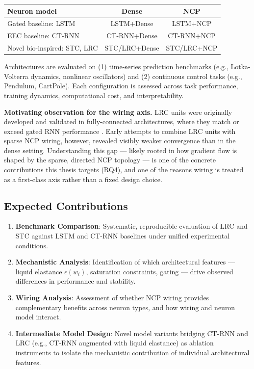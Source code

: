 \documentclass[11pt,a4paper]{article}
\begin{document}
\begin{center}
\setlength{\tabcolsep}{6pt}
\begin{tabular}{l|cc}
\textbf{Neuron model} & \textbf{Dense} & \textbf{NCP} \\
\hline
Gated baseline: LSTM         & LSTM+Dense        & LSTM+NCP \\
EEC baseline: CT-RNN         & CT-RNN+Dense      & CT-RNN+NCP \\
Novel bio-inspired: STC, LRC & STC/LRC+Dense     & STC/LRC+NCP \\
\end{tabular}
\end{center}

\noindent Architectures are evaluated on (1) time-series prediction benchmarks (e.g., Lotka-Volterra dynamics, nonlinear oscillators) and (2) continuous control tasks (e.g., Pendulum, CartPole). Each configuration is assessed across task performance, training dynamics, computational cost, and interpretability.

\smallskip
\noindent \textbf{Motivating observation for the wiring axis.} LRC units were originally developed and validated in fully-connected architectures, where they match or exceed gated RNN performance \cite{Farsang2024liquid}. Early attempts to combine LRC units with sparse NCP wiring, however, revealed visibly weaker convergence than in the dense setting. Understanding this gap --- likely rooted in how gradient flow is shaped by the sparse, directed NCP topology --- is one of the concrete contributions this thesis targets (RQ4), and one of the reasons wiring is treated as a first-class axis rather than a fixed design choice.

\subsection*{Expected Contributions}

\begin{enumerate}
    \item \textbf{Benchmark Comparison}: Systematic, reproducible evaluation of LRC and STC against LSTM and CT-RNN baselines under unified experimental conditions.
    \item \textbf{Mechanistic Analysis}: Identification of which architectural features --- liquid elastance $\epsilon(w_i)$, saturation constraints, gating --- drive observed differences in performance and stability.
    \item \textbf{Wiring Analysis}: Assessment of whether NCP wiring provides complementary benefits across neuron types, and how wiring and neuron model interact.
    \item \textbf{Intermediate Model Design}: Novel model variants bridging CT-RNN and LRC (e.g., CT-RNN augmented with liquid elastance) as ablation instruments to isolate the mechanistic contribution of individual architectural features.
\end{enumerate}
\end{document}
